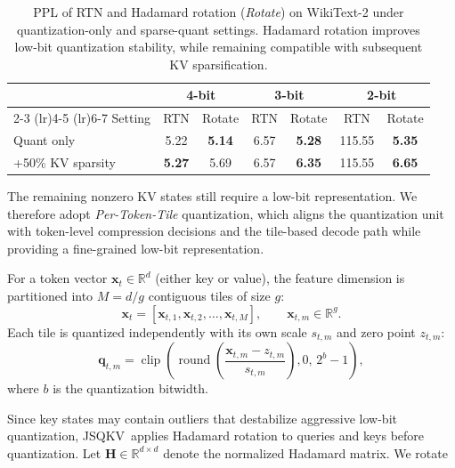 \documentclass[runningheads]{llncs}
\newcommand{\method}{JSQKV}
\begin{document}
\begin{table}[tbp]
    \centering
    \small
    \caption{PPL of RTN and Hadamard rotation (\textit{Rotate}) on WikiText-2 under quantization-only and sparse-quant settings. Hadamard rotation improves low-bit quantization stability, while remaining compatible with subsequent KV sparsification.}
    \label{tab:hadamard_sparse_quant}
    \setlength{\tabcolsep}{4pt}
    \begin{tabular}{lcccccc}
        \toprule
        & \multicolumn{2}{c}{4-bit} & \multicolumn{2}{c}{3-bit} & \multicolumn{2}{c}{2-bit} \\
        \cmidrule(lr){2-3}
        \cmidrule(lr){4-5}
        \cmidrule(lr){6-7}
        Setting & RTN & Rotate & RTN & Rotate & RTN & Rotate \\
        \midrule
        Quant only
        & 5.22 & \textbf{5.14}
        & 6.57 & \textbf{5.28}
        & 115.55 & \textbf{5.35} \\
        +50\% KV sparsity
        & \textbf{5.27} & 5.69
        & 6.57 & \textbf{6.35}
        & 115.55 & \textbf{6.65} \\
        \bottomrule
    \end{tabular}
\end{table}

The remaining nonzero KV states still require a low-bit representation. We therefore adopt \emph{Per-Token-Tile} quantization, which aligns the quantization unit with token-level compression decisions and the tile-based decode path while providing a fine-grained low-bit representation.

For a token vector $\mathbf{x}_t \in \mathbb{R}^d$ (either key or value), the feature dimension is partitioned into $M=d/g$ contiguous tiles of size $g$:
\begin{equation}
\mathbf{x}_t = [\mathbf{x}_{t,1},\mathbf{x}_{t,2},\ldots,\mathbf{x}_{t,M}], \qquad \mathbf{x}_{t,m} \in \mathbb{R}^{g}.
\end{equation}
Each tile is quantized independently with its own scale $s_{t,m}$ and zero point $z_{t,m}$:
\begin{equation}
\mathbf{q}_{t,m}
=
\operatorname{clip}\!\left(
\operatorname{round}\!\left(
\frac{\mathbf{x}_{t,m}-z_{t,m}}{s_{t,m}}
\right),
0,\,
2^b-1
\right),
\end{equation}
where $b$ is the quantization bitwidth.

Since key states may contain outliers that destabilize aggressive low-bit quantization, \method\ applies Hadamard rotation to queries and keys before quantization. Let $\mathbf{H} \in \mathbb{R}^{d \times d}$ denote the normalized Hadamard matrix. We rotate
\end{document}

